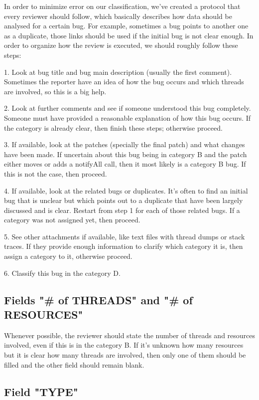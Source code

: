 In order to minimize error on our classification, we've created a protocol that every reviewer should follow, which basically describes how data should be analysed for a certain bug. For example, sometimes a bug points to another one as a duplicate, those links should be used if the initial bug is not clear enough. In order to organize how the review is executed, we should roughly follow these steps:

1. Look at bug title and bug main description (usually the first comment). Sometimes the reporter have an idea of how the bug occurs and which threads are involved, so this is a big help.

2. Look at further comments and see if someone understood this bug completely. Someone must have provided a reasonable explanation of how this bug occurs. If the category is already clear, then finish these steps; otherwise proceed.

3. If available, look at the patches (specially the final patch) and what changes have been made. If uncertain about this bug being in category B and the patch either moves or adds a notifyAll call, then it most likely is a category B bug. If this is not the case, then proceed.

4. If available, look at the related bugs or duplicates. It's often to find an initial bug that is unclear but which points out to a duplicate that have been largely discussed and is clear. Restart from step 1 for each of those related bugs. If a category was not assigned yet, then proceed.

5. See other attachments if available, like text files with thread dumps or stack traces. If they provide enough information to clarify which category it is, then assign a category to it, otherwise proceed.

6. Classify this bug in the category D.

\subsection{Fields "\# of THREADS" and "\# of RESOURCES"}

Whenever possible, the reviewer should state the number of threads and resources involved, even if this is in the category B. If it's unknown how many resources but it is clear how many threads are involved, then only one of them should be filled and the other field should remain blank.

\subsection{Field "TYPE"}

